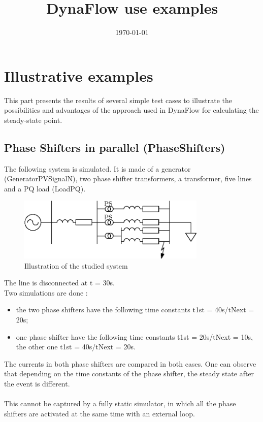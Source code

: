 \documentclass[a4paper, 12pt]{report}
\begin{document}
\title{DynaFlow use examples}
\date\today

\maketitle
\tableofcontents

\chapter{Illustrative examples}

This part presents the results of several simple test cases to illustrate the possibilities and advantages of the approach used in DynaFlow for calculating the steady-state point.

\section{Phase Shifters in parallel (PhaseShifters)}

The following system is simulated. It is made of a generator (GeneratorPVSignalN), two phase shifter transformers, a transformer, five lines and a PQ load (LoadPQ).\\

\begin{figure}[H]
  \begin{center}
  \includegraphics[width=0.8\textwidth]{PhaseShifters/PhaseShifters}
  \end{center}
  \caption{Illustration of the studied system}
\end{figure}

The line is disconnected at t = 30s.\\
Two simulations are done :
\begin{itemize}
\item the two phase shifters have the following time constants t1st = 40s/tNext = 20s;
\item one phase shifter have the following time constants t1st = 20s/tNext = 10s, the other one t1st = 40s/tNext = 20s.
\end{itemize}

The currents in both phase shifters are compared in both cases. One can observe that depending on the time constants of the phase shifter, the steady state after the event is different.\\
\\
This cannot be captured by a fully static simulator, in which all the phase shifters are activated at the same time with an external loop.
\end{document}
